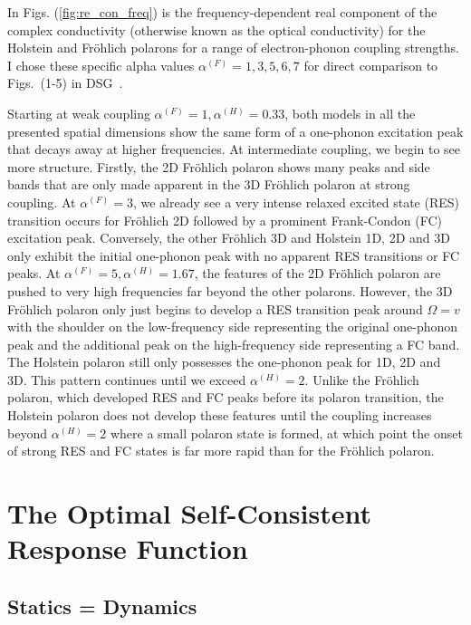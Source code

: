 In Figs. (\ref{fig:re_con_freq}) is the frequency-dependent real component of the complex conductivity (otherwise known as the optical conductivity) for the Holstein and Fr\"ohlich polarons for a range of electron-phonon coupling strengths. I chose these specific alpha values $\alpha^{(F)} = 1, 3, 5, 6, 7$ for direct comparison to Figs.~(1-5) in DSG~\cite{devreese_optical_1972}.

Starting at weak coupling $\alpha^{(F)} = 1, \alpha^{(H)} = 0.33$, both models in all the presented spatial dimensions show the same form of a one-phonon excitation peak that decays away at higher frequencies. At intermediate coupling, we begin to see more structure. Firstly, the 2D Fr\"ohlich polaron shows many peaks and side bands that are only made apparent in the 3D Fr\"ohlich polaron at strong coupling. At $\alpha^{(F)} = 3$, we already see a very intense relaxed excited state (RES) transition occurs for Fr\"ohlich 2D followed by a prominent Frank-Condon (FC) excitation peak. Conversely, the other Fr\"ohlich 3D and Holstein 1D, 2D and 3D only exhibit the initial one-phonon peak with no apparent RES transitions or FC peaks. At $\alpha^{(F)} = 5, \alpha^{(H)} = 1.67$, the features of the 2D Fr\"ohlich polaron are pushed to very high frequencies far beyond the other polarons. However, the 3D Fr\"ohlich polaron only just begins to develop a RES transition peak around $\Omega = v$ with the shoulder on the low-frequency side representing the original one-phonon peak and the additional peak on the high-frequency side representing a FC band. The Holstein polaron still only possesses the one-phonon peak for 1D, 2D and 3D. This pattern continues until we exceed $\alpha^{(H)} = 2$. Unlike the Fr\"ohlich polaron, which developed RES and FC peaks before its polaron transition, the Holstein polaron does not develop these features until the coupling increases beyond $\alpha^{(H)} = 2$ where a small polaron state is formed, at which point the onset of strong RES and FC states is far more rapid than for the Fr\"ohlich polaron. 

\section{The Optimal Self-Consistent Response Function}
\label{sec:chap-fifth-third}

\subsection{Statics = Dynamics}


